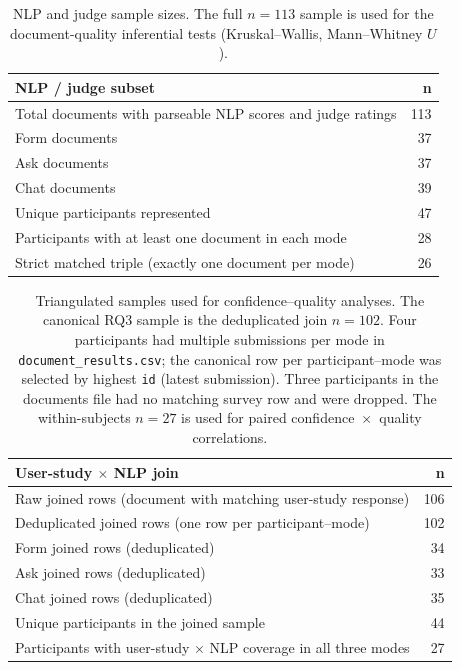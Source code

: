 \begin{table}[H]
\centering
\small
\begin{tabular}{lr}
\toprule
\textbf{NLP / judge subset} & \textbf{n} \\
\midrule
Total documents with parseable NLP scores and judge ratings & 113 \\
Form documents & 37 \\
Ask documents & 37 \\
Chat documents & 39 \\
Unique participants represented & 47 \\
Participants with at least one document in each mode & 28 \\
Strict matched triple (exactly one document per mode) & 26 \\
\bottomrule
\end{tabular}
\caption{NLP and judge sample sizes. The full $n = 113$ sample is
used for the document-quality inferential tests (Kruskal--Wallis,
Mann--Whitney $U$).}
\label{tab:n-nlp}
\end{table}

\begin{table}[H]
\centering
\small
\begin{tabular}{lr}
\toprule
\textbf{User-study $\times$ NLP join} & \textbf{n} \\
\midrule
Raw joined rows (document with matching user-study response) & 106 \\
Deduplicated joined rows (one row per participant--mode) & 102 \\
Form joined rows (deduplicated) & 34 \\
Ask joined rows (deduplicated) & 33 \\
Chat joined rows (deduplicated) & 35 \\
Unique participants in the joined sample & 44 \\
Participants with user-study $\times$ NLP coverage in all three modes & 27 \\
\bottomrule
\end{tabular}
\caption{Triangulated samples used for confidence--quality
analyses. The canonical RQ3 sample is the deduplicated join
$n = 102$. Four participants had multiple submissions per mode in
\texttt{document\_results.csv}; the canonical row per
participant--mode was selected by highest \texttt{id} (latest
submission). Three participants in the documents file had no
matching survey row and were dropped. The within-subjects
$n = 27$ is used for paired confidence~$\times$~quality
correlations.}
\label{tab:n-triangulation}
\end{table}

